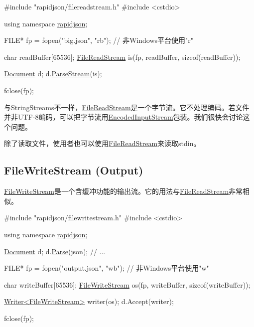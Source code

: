 \begin{DoxyCode}
\textcolor{preprocessor}{#include "rapidjson/filereadstream.h"}
\textcolor{preprocessor}{#include <cstdio>}

\textcolor{keyword}{using namespace }\hyperlink{namespacerapidjson}{rapidjson};

FILE* fp = fopen(\textcolor{stringliteral}{"big.json"}, \textcolor{stringliteral}{"rb"}); \textcolor{comment}{// 非Windows平台使用"r"}

\textcolor{keywordtype}{char} readBuffer[65536];
\hyperlink{class_file_read_stream}{FileReadStream} is(fp, readBuffer, \textcolor{keyword}{sizeof}(readBuffer));

\hyperlink{class_generic_document}{Document} d;
d.\hyperlink{class_generic_document_afe94c0abc83a20f2d7dc1ba7677e6238}{ParseStream}(is);

fclose(fp);
\end{DoxyCode}


与{\ttfamily String\+Streams}不一样，{\ttfamily \hyperlink{class_file_read_stream}{File\+Read\+Stream}}是一个字节流。它不处理编码。若文件并非\+U\+T\+F-\/8编码，可以把字节流用{\ttfamily \hyperlink{class_encoded_input_stream}{Encoded\+Input\+Stream}}包装。我们很快会讨论这个问题。

除了读取文件，使用者也可以使用{\ttfamily \hyperlink{class_file_read_stream}{File\+Read\+Stream}}来读取{\ttfamily stdin}。\hypertarget{md_Commun_Externe_RapidJSON_doc_stream.zh-cn_FileWriteStream}{}\subsection{File\+Write\+Stream (\+Output)}\label{md_Commun_Externe_RapidJSON_doc_stream.zh-cn_FileWriteStream}
{\ttfamily \hyperlink{class_file_write_stream}{File\+Write\+Stream}}是一个含缓冲功能的输出流。它的用法与{\ttfamily \hyperlink{class_file_read_stream}{File\+Read\+Stream}}非常相似。


\begin{DoxyCode}
\textcolor{preprocessor}{#include "rapidjson/filewritestream.h"}
\textcolor{preprocessor}{#include <cstdio>}

\textcolor{keyword}{using namespace }\hyperlink{namespacerapidjson}{rapidjson};

\hyperlink{class_generic_document}{Document} d;
d.\hyperlink{class_generic_document_aebd4e7fddd80c1e1174837aee6d2159b}{Parse}(json);
\textcolor{comment}{// ...}

FILE* fp = fopen(\textcolor{stringliteral}{"output.json"}, \textcolor{stringliteral}{"wb"}); \textcolor{comment}{// 非Windows平台使用"w"}

\textcolor{keywordtype}{char} writeBuffer[65536];
\hyperlink{class_file_write_stream}{FileWriteStream} os(fp, writeBuffer, \textcolor{keyword}{sizeof}(writeBuffer));

\hyperlink{class_writer}{Writer<FileWriteStream>} writer(os);
d.Accept(writer);

fclose(fp);
\end{DoxyCode}


